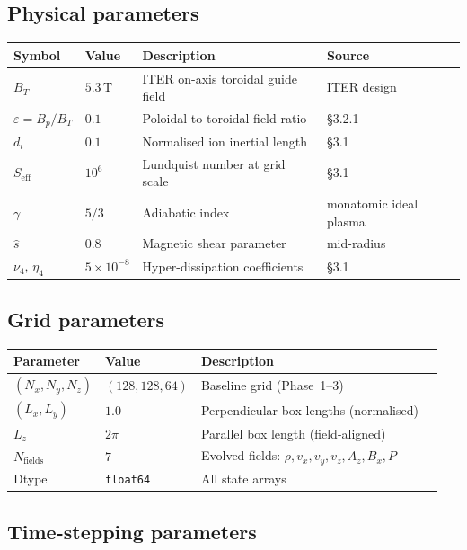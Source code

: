 \documentclass[11pt, a4paper]{article}
\begin{document}
\subsection{Physical parameters}

\begin{center}
\begin{tabular}{llll}
\toprule
Symbol & Value & Description & Source \\
\midrule
$B_T$ & $5.3\,\text{T}$ & ITER on-axis toroidal guide field & ITER design \\
$\varepsilon = B_p/B_T$ & $0.1$ & Poloidal-to-toroidal field ratio & \S3.2.1 \\
$d_i$ & $0.1$ & Normalised ion inertial length & \S3.1 \\
$S_\text{eff}$ & $10^6$ & Lundquist number at grid scale & \S3.1 \\
$\gamma$ & $5/3$ & Adiabatic index & monatomic ideal plasma \\
$\hat{s}$ & $0.8$ & Magnetic shear parameter & mid-radius \\
$\nu_4,\,\eta_4$ & $5\times10^{-8}$ & Hyper-dissipation coefficients & \S3.1 \\
\bottomrule
\end{tabular}
\end{center}

\subsection{Grid parameters}

\begin{center}
\begin{tabular}{llll}
\toprule
Parameter & Value & Description \\
\midrule
$(N_x, N_y, N_z)$ & $(128, 128, 64)$ & Baseline grid (Phase~1--3) \\
$(L_x, L_y)$ & $1.0$ & Perpendicular box lengths (normalised) \\
$L_z$ & $2\pi$ & Parallel box length (field-aligned) \\
$N_\text{fields}$ & $7$ & Evolved fields: $\rho, v_x, v_y, v_z, A_z, B_x, P$ \\
Dtype & \texttt{float64} & All state arrays \\
\bottomrule
\end{tabular}
\end{center}

\subsection{Time-stepping parameters}
\end{document}

